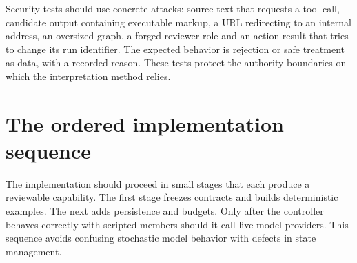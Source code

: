 \documentclass[12pt,a4paper,oneside,openany]{book}
\begin{document}
Security tests should use concrete attacks: source text that requests a tool
call, candidate output containing executable markup, a URL redirecting to an
internal address, an oversized graph, a forged reviewer role and an action result
that tries to change its run identifier. The expected behavior is rejection or
safe treatment as data, with a recorded reason. These tests protect the authority
boundaries on which the interpretation method relies.

\section{The ordered implementation sequence}
\label{merge:M08:11}


The implementation should proceed in small stages that each produce a reviewable
capability. The first stage freezes contracts and builds deterministic examples.
The next adds persistence and budgets. Only after the controller behaves correctly
with scripted members should it call live model providers. This sequence avoids
confusing stochastic model behavior with defects in state management.
\end{document}
